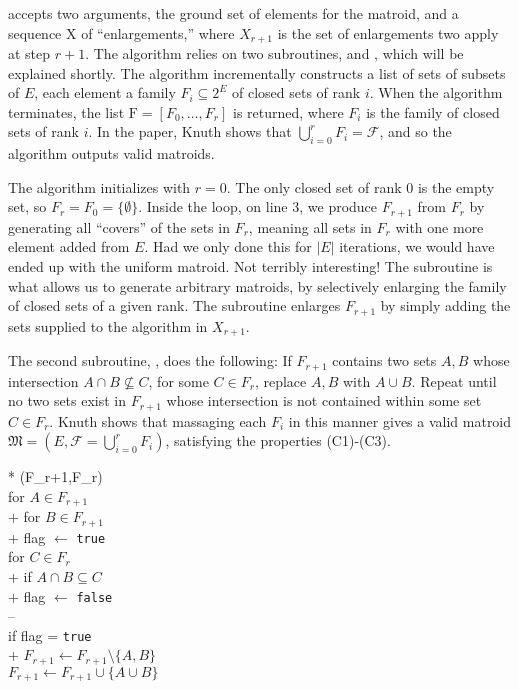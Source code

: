 accepts two arguments, the ground set of elements for the matroid, and a sequence $\mathrm{X}$ of ``enlargements,'' where $X_{r+1}$ is the set of enlargements two apply at step $r+1$. The algorithm relies on two subroutines,  and , which will be explained shortly. The algorithm incrementally constructs a list of sets of subsets of $E$, each element a family $F_i \subseteq 2^E$ of closed sets of rank $i$. When the algorithm terminates, the list $\mathrm{F} = [F_0, \ldots, F_r]$ is returned, where $F_i$ is the family of closed sets of rank $i$. In the paper, Knuth shows that $\bigcup_{i=0}^r F_i = \mathcal{F}$, and so the algorithm outputs valid matroids.

The algorithm initializes with $r = 0$. The only closed set of rank 0 is the empty set, so $F_r = F_0 = \{ \emptyset \}$. Inside the loop, on line 3, we produce $F_{r+1}$ from $F_r$ by generating all ``covers'' of the sets in $F_r$, meaning all sets in $F_r$ with one more element added from $E$. Had we only done this for $|E|$ iterations, we would have ended up with the uniform matroid. Not terribly interesting! The  subroutine is what allows us to generate arbitrary matroids, by selectively enlarging the family of closed sets of a given rank. The subroutine enlarges $F_{r+1}$ by simply adding the sets supplied to the algorithm in $X_{r+1}$.

The second subroutine, , does the following: If $F_{r+1}$ contains two sets $A,B$ whose intersection $A \cap B \not \subseteq C$, for some $C \in F_{r}$, replace $A,B$ with $A \cup B$. Repeat until no two sets exist in $F_{r+1}$ whose intersection is not contained within some set $C \in F_{r}$. Knuth shows that massaging each $F_{i}$ in this manner gives a valid matroid $\mathfrak{M} = (E, \mathcal{F} = \bigcup_{i=0}^r F_i)$, satisfying the properties (C1)-(C3).

\begin{pseudo}*
  ({F_{r+1},F_r}) \\
  for $A \in F_{r+1}$ \\+
  for $B \in F_{r+1}$ \\+
  flag $\leftarrow$ \texttt{true} \\
  for $C \in F_r$ \\+
  if $A \cap B \subseteq C$ \\+
  flag $\leftarrow$ \texttt{false} \\--
  \\
  if flag = \texttt{true} \\+
  $F_{r+1} \leftarrow F_{r+1} \setminus \{A, B \}$ \\
  $F_{r+1} \leftarrow F_{r+1} \cup \{A \cup B \}$ \\




\end{pseudo}

